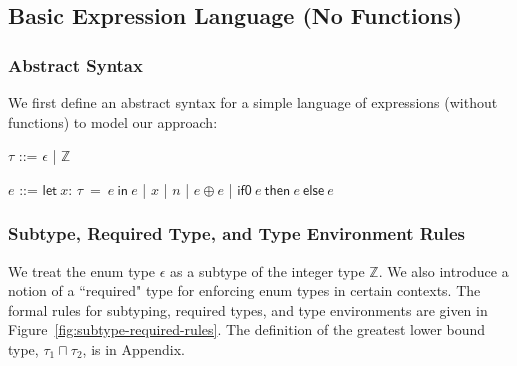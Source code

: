 \documentclass[peerreview, 10pt]{IEEEtran}
\newcommand{\Z}{\ensuremath{\mathbb{Z}}}
\newcommand{\lett}[4]{\ensuremath{\mathsf{let}\ #1\mathsf{:}\,#2\ \mathsf{=}\ #3\ \mathsf{in}\ #4}}
\newcommand{\binop}[2]{\ensuremath{#1\ \mathsf{\oplus}\ #2}}
\newcommand{\ternary}[3]{\ensuremath{\mathsf{if0}\ #1\ \mathsf{then}\ #2\ \mathsf{else}\ #3}}
\begin{document}
\subsection{Basic Expression Language (No Functions)}
\subsubsection{Abstract Syntax}
We first define an abstract syntax for a simple language of expressions (without functions) to model our approach:

\vspace{0.5em}
\begin{bnf}
    $\tau$ ::= $\epsilon$ | $\Z$
\end{bnf}

\begin{bnf}
    $e$ ::= \lett{x}{\tau}{e}{e} 
    | $x$ 
    | $n$ 
    | \binop{e}{e} 
    | \ternary{e}{e}{e}
\end{bnf}
\vspace{0.5em}

\subsubsection{Subtype, Required Type, and Type Environment Rules}
We treat the enum type $\epsilon$ as a subtype of the integer type $\Z$. We also introduce a notion of a ``required" type for enforcing enum types in certain contexts. The formal rules for subtyping, required types, and type environments are given in Figure~\ref{fig:subtype-required-rules}. The definition of the greatest lower bound type, $\tau_1\sqcap\tau_2$, is in Appendix.
\end{document}
